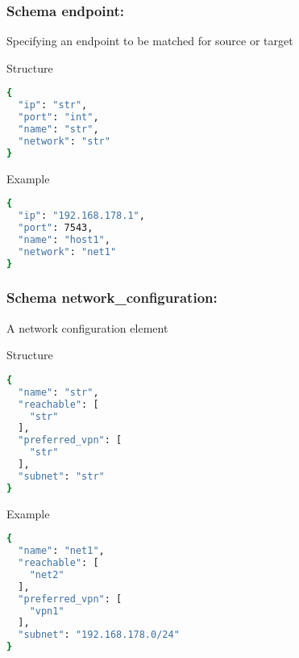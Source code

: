\newpage
\subsubsection{Schema endpoint:}
\label{esmf_endpoint}
Specifying an endpoint to be matched for source or target
\begin{codes}
\item[Structure] \begin{lstlisting}[language=bash]
{
  "ip": "str",
  "port": "int",
  "name": "str",
  "network": "str"
}
\end{lstlisting}
\end{codes}
\begin{codes}
\item[Example] \begin{lstlisting}[language=bash]
{
  "ip": "192.168.178.1",
  "port": 7543,
  "name": "host1",
  "network": "net1"
}
\end{lstlisting}
\end{codes}

\newpage
\subsubsection{Schema network\_configuration:}
\label{esmf_network_configuration}
A network configuration element
\begin{codes}
\item[Structure] \begin{lstlisting}[language=bash]
{
  "name": "str",
  "reachable": [
    "str"
  ],
  "preferred_vpn": [
    "str"
  ],
  "subnet": "str"
}
\end{lstlisting}
\end{codes}
\begin{codes}
\item[Example] \begin{lstlisting}[language=bash]
{
  "name": "net1",
  "reachable": [
    "net2"
  ],
  "preferred_vpn": [
    "vpn1"
  ],
  "subnet": "192.168.178.0/24"
}
\end{lstlisting}
\end{codes}

\newpage
